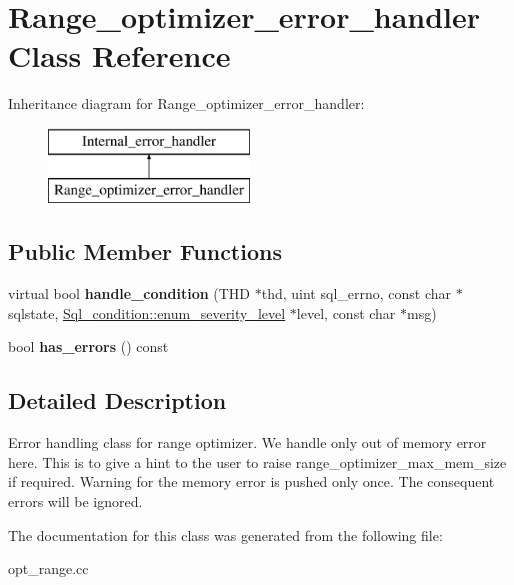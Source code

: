 \hypertarget{classRange__optimizer__error__handler}{}\section{Range\+\_\+optimizer\+\_\+error\+\_\+handler Class Reference}
\label{classRange__optimizer__error__handler}
Inheritance diagram for Range\+\_\+optimizer\+\_\+error\+\_\+handler\+:\begin{figure}[H]
\begin{center}
\leavevmode
\includegraphics[height=2.000000cm]{classRange__optimizer__error__handler}
\end{center}
\end{figure}
\subsection*{Public Member Functions}
\begin{DoxyCompactItemize}
\item 
\mbox{\label{classRange__optimizer__error__handler_a801cc47d4eb14e281b4e5a36e35aff86}} 
virtual bool {\bfseries handle\+\_\+condition} (T\+HD $\ast$thd, uint sql\+\_\+errno, const char $\ast$sqlstate, \mbox{\hyperlink{classSql__condition_ab0602581e19cddb609bfe10c44be4e83}{Sql\+\_\+condition\+::enum\+\_\+severity\+\_\+level}} $\ast$level, const char $\ast$msg)
\item 
\mbox{\label{classRange__optimizer__error__handler_ab8fbb40227e09973430bc7e23f16075c}} 
bool {\bfseries has\+\_\+errors} () const
\end{DoxyCompactItemize}


\subsection{Detailed Description}
Error handling class for range optimizer. We handle only out of memory error here. This is to give a hint to the user to raise range\+\_\+optimizer\+\_\+max\+\_\+mem\+\_\+size if required. Warning for the memory error is pushed only once. The consequent errors will be ignored. 

The documentation for this class was generated from the following file\+:\begin{DoxyCompactItemize}
\item 
opt\+\_\+range.\+cc\end{DoxyCompactItemize}
